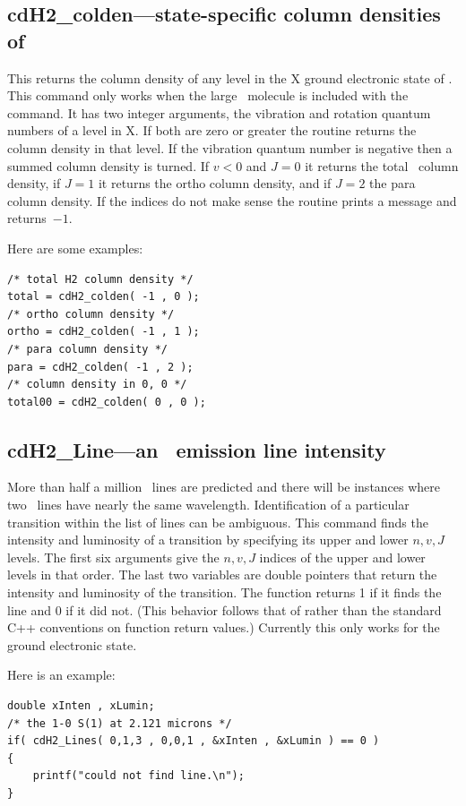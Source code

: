 \subsection{cdH2\_colden---state-specific column densities of \htwo}

This returns the column density of any level in the X ground
electronic state of \htwo.
This command only works when the large \htwo\ molecule
is included with the  command.
It has two integer arguments, the
vibration and rotation quantum numbers of a level in X.
If both are zero
or greater the routine returns the column density in that level.
If the
vibration quantum number is negative then a summed column density is turned.
If $v<0$ and $J=0$ it returns the total \htwo\ column density, if $J=1$ it returns
the ortho column density, and if $J=2$ the para column density.
If the indices
do not make sense the routine prints a message and returns~$-1$.

Here are some examples:
\begin{verbatim}
/* total H2 column density */
total = cdH2_colden( -1 , 0 );
/* ortho column density */
ortho = cdH2_colden( -1 , 1 );
/* para column density */
para = cdH2_colden( -1 , 2 );
/* column density in 0, 0 */
total00 = cdH2_colden( 0 , 0 );
\end{verbatim}

\subsection{cdH2\_Line---an \htwo\ emission line intensity}

More than half a million \htwo\ lines are predicted and there will be
instances where two \htwo\ lines have nearly the same wavelength.  Identification
of a particular transition within the list of lines can be ambiguous.  This
command finds the intensity and luminosity of a transition by specifying
its upper and lower $n, v, J$ levels.
The first six arguments give the $n,
v, J$ indices of the upper and lower levels in that order.
The last two
variables are double pointers that return the intensity and luminosity of
the transition.
The function returns 1 if it finds the line and 0 if it
did not.
(This behavior follows that of  rather than the standard
C++ conventions on function return values.)
Currently this only works
for the ground electronic state.

Here is an example:
\begin{verbatim}
double xInten , xLumin;
/* the 1-0 S(1) at 2.121 microns */
if( cdH2_Lines( 0,1,3 , 0,0,1 , &xInten , &xLumin ) == 0 )
{
    printf("could not find line.\n");
}
\end{verbatim}


